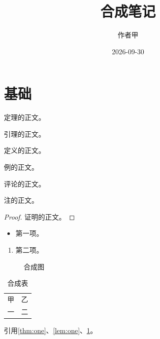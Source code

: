 \documentclass[device=normal,color=green,mode=sepia]{elegantnote}
\title{合成笔记}
\author{作者甲}
\institute{合成学院}
\date{2026-09-30}
\begin{document}
\maketitle
\tableofcontents
\section{基础}\label{sec:intro}
\begin{theorem}[有限性]\label{thm:one}
定理的正文。
\end{theorem}
\begin{lemma}\label{lem:one}
引理的正文。
\end{lemma}
\begin{definition}[集合]\label{def:one}
定义的正文。
\end{definition}
\begin{example}\label{ex:one}
例的正文。
\end{example}
\begin{remark}
评论的正文。
\end{remark}
\begin{note}
注的正文。
\end{note}
\begin{proof}
证明的正文。
\end{proof}
\begin{itemize}\item 第一项。\end{itemize}
\begin{enumerate}\item 第二项。\end{enumerate}
\begin{figure}\centering\caption{合成图}\label{fig:one}\end{figure}
\begin{table}\caption{合成表}\label{tab:one}\begin{tabular}{lc}甲&乙\\一&二\end{tabular}\end{table}
引用\ref{thm:one}、\ref{lem:one}、\ref{fig:one}。
\end{document}
